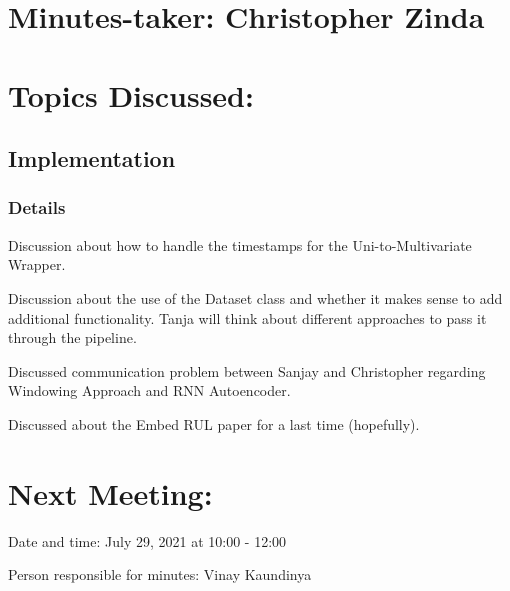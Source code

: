 \documentclass[11pt]{meetingmins} %
\begin{document}
\maketitle

\section{Minutes-taker: Christopher Zinda}

\section{Topics Discussed:}

\subsection{Implementation}
\subsubsection{Details}
\begin{hiddensubitems}
    \item Discussion about how to handle the timestamps for the Uni-to-Multivariate Wrapper.
    \item Discussion about the use of the Dataset class and whether it makes sense to add additional functionality. Tanja will think about different approaches to pass it through the pipeline.
    \item Discussed communication problem between Sanjay and Christopher regarding Windowing Approach and RNN Autoencoder.
    \item Discussed about the Embed RUL paper for a last time (hopefully).
\end{hiddensubitems}

\section{Next Meeting:}
\begin{hiddensubitems}
    \item Date and time: July 29, 2021 at 10:00 - 12:00
    \item Person responsible for minutes: Vinay Kaundinya
\end{hiddensubitems}
\end{document}
